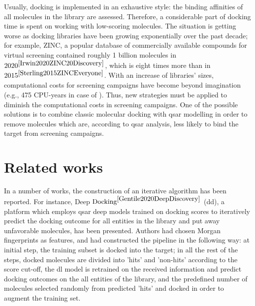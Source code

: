 Usually, docking is implemented in an exhaustive style: the binding affinities of all molecules in the library are assessed.
Therefore, a considerable part of docking time is spent on working with low-scoring molecules.
The situation is getting worse as docking libraries have been growing exponentially over the past decade; for example, ZINC, a popular database of commercially available compounds for virtual screening contained roughly 1 billion molecules in $2020^{\cite{Irwin2020ZINC20Discovery}}$, which is eight times more than in $2015^{\cite{Sterling2015ZINCEveryone}}$.
With an increase of libraries' sizes, computational costs for screening campaigns have become beyond imagination (e.g.,  475 CPU-years in case of \cite{Gorgulla2020AnScreens}).
Thus, new strategies must be applied to diminish the computational costs in screening campaigns.
One of the possible solutions is to combine classic molecular docking with \acrshort{qsar} modelling in order to remove molecules which are, according to \acrshort{qsar} analysis, less likely to bind the target from screening campaigns.\\

\section{Related works}
 
In a number of works, the construction of an iterative algorithm has been reported.
For instance, Deep $\text{Docking}^{\cite{Gentile2020DeepDiscovery}}$ (\acrshort{dd}), a platform which employs \acrshort{qsar} deep models trained on docking scores to iteratively predict the docking outcome for all entities in the library and put away unfavorable molecules, has been presented.
Authors had chosen Morgan fingerprints as features, and had constructed the pipeline in the following way: at initial step, the training subset is docked into the target; in all the rest of the steps, docked molecules are divided into 'hits' and 'non-hits' according to the score cut-off, the \acrshort{dl} model is retrained on the received information and predict docking outcomes on the all entities of the library, and the predefined number of molecules selected randomly from predicted 'hits' and docked in order to augment the training set.\\

